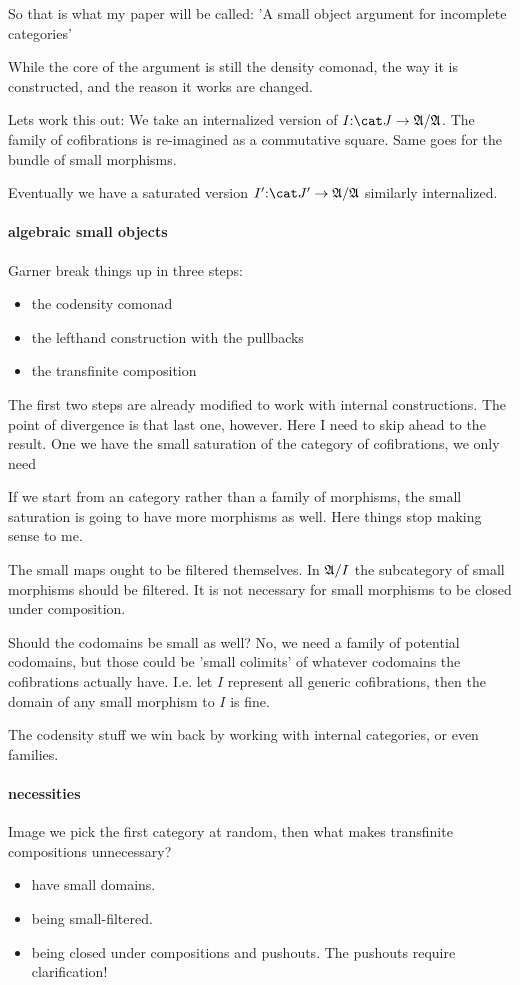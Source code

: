 \documentclass[csh.tex]{subfiles}
\begin{document}
So that is what my paper will be called:
'A small object argument for incomplete categories'

While the core of the argument is still the density comonad, the way it is constructed, and the reason it works are changed.

Lets work this out:
We take an internalized version of $I\of \cat J\to\ambient/\ambient$. The family of cofibrations is re-imagined as a commutative square. Same goes for the bundle of small morphisms.

Eventually we have a saturated version $I'\of \cat J'\to\ambient/\ambient$ similarly internalized.

\paragraph{algebraic small objects}

Garner break things up in three steps:
\begin{itemize}
\item the codensity comonad
\item the lefthand construction with the pullbacks
\item the transfinite composition
\end{itemize}

The first two steps are already modified to work with internal constructions.
The point of divergence is that last one, however. Here I need to skip ahead to the result.
One we have the small saturation of the category of cofibrations, we only need 

If we start from an category rather than a family of morphisms, the small saturation is going to have more morphisms as well.
Here things stop making sense to me.

The small maps ought to be filtered themselves. In $\mathfrak A/I$ the subcategory of small morphisms should be filtered. It is not necessary for small morphisms to be closed under composition.

Should the codomains be small as well? No, we need a family of potential codomains, but those could be 'small colimits' of whatever codomains the cofibrations actually have. I.e. let $I$ represent all generic cofibrations, then the domain of any small morphism to $I$ is fine.

The codensity stuff we win back by working with internal categories, or even families.

\paragraph{necessities}
Image we pick the first category at random, then what makes transfinite compositions unnecessary?
\begin{itemize}
\item have small domains.
\item being small-filtered.
\item being closed under compositions and pushouts. The pushouts require clarification!
\end{itemize}
\end{document}
